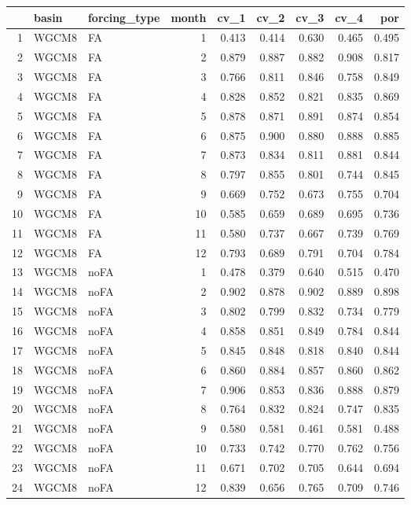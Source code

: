 \documentclass{agujournal2019}
\begin{document}
\begin{table}[ht]
\centering
\begin{tabular}{rllrrrrrr}
  \hline
 & basin & forcing\_type & month & cv\_1 & cv\_2 & cv\_3 & cv\_4 & por \\ 
  \hline
1 & WGCM8 & FA &    1 & 0.413 & 0.414 & 0.630 & 0.465 & 0.495 \\ 
  2 & WGCM8 & FA &    2 & 0.879 & 0.887 & 0.882 & 0.908 & 0.817 \\ 
  3 & WGCM8 & FA &    3 & 0.766 & 0.811 & 0.846 & 0.758 & 0.849 \\ 
  4 & WGCM8 & FA &    4 & 0.828 & 0.852 & 0.821 & 0.835 & 0.869 \\ 
  5 & WGCM8 & FA &    5 & 0.878 & 0.871 & 0.891 & 0.874 & 0.854 \\ 
  6 & WGCM8 & FA &    6 & 0.875 & 0.900 & 0.880 & 0.888 & 0.885 \\ 
  7 & WGCM8 & FA &    7 & 0.873 & 0.834 & 0.811 & 0.881 & 0.844 \\ 
  8 & WGCM8 & FA &    8 & 0.797 & 0.855 & 0.801 & 0.744 & 0.845 \\ 
  9 & WGCM8 & FA &    9 & 0.669 & 0.752 & 0.673 & 0.755 & 0.704 \\ 
  10 & WGCM8 & FA &   10 & 0.585 & 0.659 & 0.689 & 0.695 & 0.736 \\ 
  11 & WGCM8 & FA &   11 & 0.580 & 0.737 & 0.667 & 0.739 & 0.769 \\ 
  12 & WGCM8 & FA &   12 & 0.793 & 0.689 & 0.791 & 0.704 & 0.784 \\ 
  13 & WGCM8 & noFA &    1 & 0.478 & 0.379 & 0.640 & 0.515 & 0.470 \\ 
  14 & WGCM8 & noFA &    2 & 0.902 & 0.878 & 0.902 & 0.889 & 0.898 \\ 
  15 & WGCM8 & noFA &    3 & 0.802 & 0.799 & 0.832 & 0.734 & 0.779 \\ 
  16 & WGCM8 & noFA &    4 & 0.858 & 0.851 & 0.849 & 0.784 & 0.844 \\ 
  17 & WGCM8 & noFA &    5 & 0.845 & 0.848 & 0.818 & 0.840 & 0.844 \\ 
  18 & WGCM8 & noFA &    6 & 0.860 & 0.884 & 0.857 & 0.860 & 0.862 \\ 
  19 & WGCM8 & noFA &    7 & 0.906 & 0.853 & 0.836 & 0.888 & 0.879 \\ 
  20 & WGCM8 & noFA &    8 & 0.764 & 0.832 & 0.824 & 0.747 & 0.835 \\ 
  21 & WGCM8 & noFA &    9 & 0.580 & 0.581 & 0.461 & 0.581 & 0.488 \\ 
  22 & WGCM8 & noFA &   10 & 0.733 & 0.742 & 0.770 & 0.762 & 0.756 \\ 
  23 & WGCM8 & noFA &   11 & 0.671 & 0.702 & 0.705 & 0.644 & 0.694 \\ 
  24 & WGCM8 & noFA &   12 & 0.839 & 0.656 & 0.765 & 0.709 & 0.746 \\ 
   \hline
\end{tabular}
\end{table}
\end{document}
